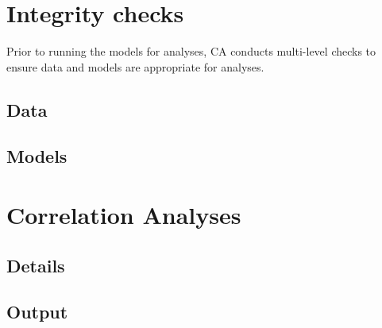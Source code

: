 \documentclass[]{book}
\begin{document}
\section{Integrity checks}\label{integrity-checks}

Prior to running the models for analyses, CA conducts multi-level checks
to ensure data and models are appropriate for analyses.

\subsection{Data}\label{data}

\subsection{Models}\label{models}

\section{Correlation Analyses}\label{correlation-analyses}

\subsection{Details}\label{details}

\subsection{Output}\label{output}
\end{document}
